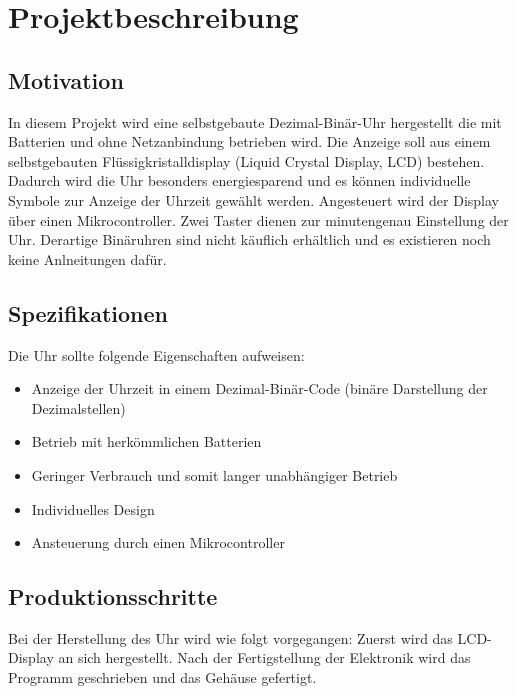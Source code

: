 \section{Projektbeschreibung}
\subsection{Motivation}
In diesem Projekt wird eine selbstgebaute Dezimal-Binär-Uhr hergestellt die mit Batterien und ohne Netzanbindung betrieben wird. Die Anzeige soll aus einem selbstgebauten Flüssigkristalldisplay (Liquid Crystal Display, LCD) bestehen. Dadurch wird die Uhr besonders energiesparend und es können individuelle Symbole zur Anzeige der Uhrzeit gewählt werden. Angesteuert wird der Display über einen Mikrocontroller. Zwei Taster dienen zur minutengenau Einstellung der Uhr. Derartige Binäruhren sind nicht käuflich erhältlich und es existieren noch keine Anlneitungen dafür.

\subsection{Spezifikationen}
Die Uhr sollte folgende Eigenschaften aufweisen:
\begin{itemize}
\item Anzeige der Uhrzeit in einem Dezimal-Binär-Code (binäre Darstellung der Dezimalstellen)
\item Betrieb mit herkömmlichen Batterien
\item Geringer Verbrauch und somit langer unabhängiger Betrieb
\item Individuelles Design
\item Ansteuerung durch einen Mikrocontroller
\end{itemize}

\subsection{Produktionsschritte}

Bei der Herstellung des Uhr wird wie folgt vorgegangen: Zuerst wird das LCD-Display an sich hergestellt. Nach der Fertigstellung der Elektronik wird das Programm geschrieben und das Gehäuse gefertigt. 



